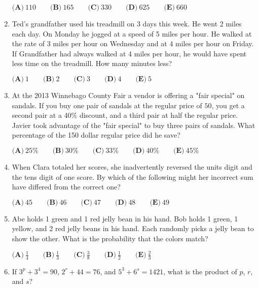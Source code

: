 \documentclass{article}
\begin{document}
\begin{enumerate}[label=\arabic*., itemsep=0.5em]
\(\textbf{(A)}\ 110 \qquad \textbf{(B)}\ 165 \qquad \textbf{(C)}\ 330 \qquad \textbf{(D)}\ 625 \qquad \textbf{(E)}\ 660\)\par \vspace{0.5em}\item Ted's grandfather used his treadmill on 3 days this week. He went 2 miles each day. On Monday he jogged at a speed of 5 miles per hour. He walked at the rate of 3 miles per hour on Wednesday and at 4 miles per hour on Friday. If Grandfather had always walked at 4 miles per hour, he would have spent less time on the treadmill. How many minutes less?

\(\textbf{(A)}\ 1 \qquad \textbf{(B)}\ 2 \qquad \textbf{(C)}\ 3 \qquad \textbf{(D)}\ 4 \qquad \textbf{(E)}\ 5\)\par \vspace{0.5em}\item At the 2013 Winnebago County Fair a vendor is offering a "fair special" on sandals. If you buy one pair of sandals at the regular price of \(50\), you get a second pair at a 40\% discount, and a third pair at half the regular price. Javier took advantage of the "fair special" to buy three pairs of sandals. What percentage of the 150 dollar regular price did he save?

\(\textbf{(A)}\ 25\% \qquad \textbf{(B)}\ 30\% \qquad \textbf{(C)}\ 33\% \qquad \textbf{(D)}\ 40\% \qquad \textbf{(E)}\ 45\%\)\par \vspace{0.5em}\item When Clara totaled her scores, she inadvertently reversed the units digit and the tens digit of one score. By which of the following might her incorrect sum have differed from the correct one?

\(\textbf{(A)}\ 45 \qquad \textbf{(B)}\ 46 \qquad \textbf{(C)}\ 47 \qquad \textbf{(D)}\ 48 \qquad \textbf{(E)}\ 49\)\par \vspace{0.5em}\item Abe holds 1 green and 1 red jelly bean in his hand. Bob holds 1 green, 1 yellow, and 2 red jelly beans in his hand. Each randomly picks a jelly bean to show the other. What is the probability that the colors match?

\(\textbf{(A)}\ \frac14 \qquad \textbf{(B)}\ \frac13 \qquad \textbf{(C)}\ \frac38 \qquad \textbf{(D)}\ \frac12 \qquad \textbf{(E)}\ \frac23\)\par \vspace{0.5em}\item If \(3^p + 3^4 = 90\), \(2^r + 44 = 76\), and \(5^3 + 6^s = 1421\), what is the product of \(p\), \(r\), and \(s\)?


\end{enumerate}
\end{document}
